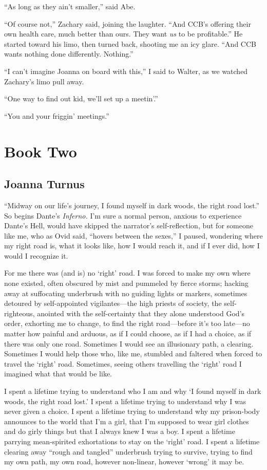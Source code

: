 ``As long as they ain't smaller,'' said Abe.

``Of course not,'' Zachary said, joining the laughter. ``And CCB's
offering their own health care, much better than ours. They want
\emph{us} to be profitable.'' He started toward his limo, then turned
back, shooting me an icy glare. ``And CCB wants nothing done
differently. Nothing.''

``I can't imagine Joanna on board with this,'' I said to Walter, as we
watched Zachary's limo pull away.

``One way to find out kid, we'll set up a meetin'.''

``You and your friggin' meetings.''

\part{Book Two}

\chapter{Joanna Turnus}

\titlemark

``Midway on our life's journey, I found myself in dark woods, the right
road lost.'' So begins Dante's \emph{Inferno.} I'm sure a normal person,
anxious to experience Dante's Hell, would have skipped the narrator's
self-reflection, but for someone like me, who as Ovid said, ``hovers
between the sexes,'' I paused, wondering where my right road is, what it
looks like, how I would reach it, and if I ever did, how I would I
recognize it.

For me there was (and is) no `right' road. I was forced to make my own
where none existed, often obscured by mist and pummeled by fierce
storms; hacking away at suffocating underbrush with no guiding lights or
markers, sometimes detoured by self-appointed vigilantes---the high
priests of society, the self-righteous, anointed with the self-certainty
that they alone understood God's order, exhorting me to change, to find
the right road---before it's too late---no matter how painful and
arduous, as if I could choose, as if I had a choice, as if there was
only one road. Sometimes I would see an illusionary path, a clearing.
Sometimes I would help those who, like me, stumbled and faltered when
forced to travel the `right' road. Sometimes, seeing others travelling
the `right' road I imagined what that would be like.

I spent a lifetime trying to understand who I am and why `I found myself
in dark woods, the right road lost.' I spent a lifetime trying to
understand why I was never given a choice. I spent a lifetime trying to
understand why my prison-body announces to the world that I'm a girl,
that I'm supposed to wear girl clothes and do girly things but that I
always knew I was a boy. I spent a lifetime parrying mean-spirited
exhortations to stay on the `right' road. I spent a lifetime clearing
away ``rough and tangled'' underbrush trying to survive, trying to find
my own path, my own road, however non-linear, however `wrong' it may be.

